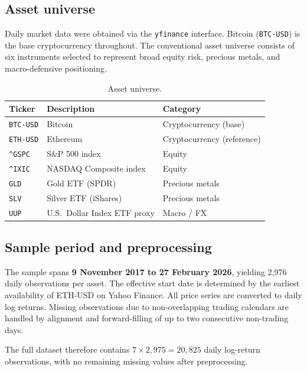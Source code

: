 \documentclass[12pt, a4paper]{article}
\begin{document}
\subsection{Asset universe}

Daily market data were obtained via the \texttt{yfinance} interface.
Bitcoin (\texttt{BTC-USD}) is the base cryptocurrency throughout.
The conventional asset universe consists of six instruments selected
to represent broad equity risk, precious metals, and macro-defensive
positioning.

\begin{table}[H]
  \centering
  \caption{Asset universe.}
  \label{tab:assets}
  \begin{tabular}{lll}
    \toprule
    Ticker        & Description                        & Category \\
    \midrule
    \texttt{BTC-USD}  & Bitcoin                        & Cryptocurrency (base) \\
    \texttt{ETH-USD}  & Ethereum                       & Cryptocurrency (reference) \\
    \texttt{\^{}GSPC} & S\&P 500 index                 & Equity \\
    \texttt{\^{}IXIC} & NASDAQ Composite index          & Equity \\
    \texttt{GLD}      & Gold ETF (SPDR)                & Precious metals \\
    \texttt{SLV}      & Silver ETF (iShares)           & Precious metals \\
    \texttt{UUP}      & U.S.\ Dollar Index ETF proxy   & Macro / FX \\
    \bottomrule
  \end{tabular}
\end{table}

\subsection{Sample period and preprocessing}

The sample spans \textbf{9 November 2017 to 27 February 2026},
yielding 2{,}976 daily observations per asset.
The effective start date is determined by the earliest availability
of ETH-USD on Yahoo Finance.
All price series are converted to daily log returns.
Missing observations due to non-overlapping trading calendars
are handled by alignment and forward-filling of up to two
consecutive non-trading days.

The full dataset therefore contains $7 \times 2{,}975 = 20{,}825$
daily log-return observations, with no remaining missing values
after preprocessing.
\end{document}
